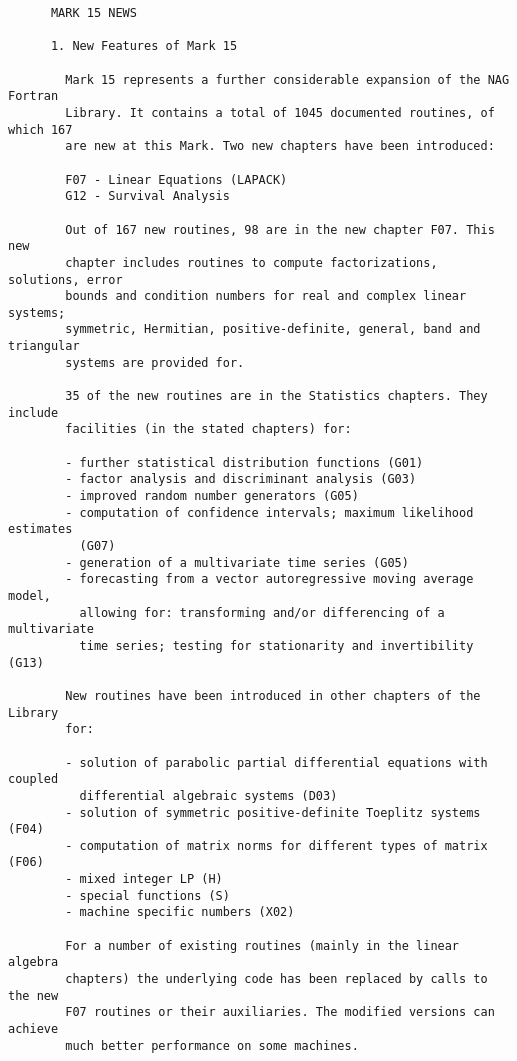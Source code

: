 \begin{small}
\begin{verbatim}
      MARK 15 NEWS

      1. New Features of Mark 15

        Mark 15 represents a further considerable expansion of the NAG Fortran
        Library. It contains a total of 1045 documented routines, of which 167
        are new at this Mark. Two new chapters have been introduced:

        F07 - Linear Equations (LAPACK)
        G12 - Survival Analysis

        Out of 167 new routines, 98 are in the new chapter F07. This new
        chapter includes routines to compute factorizations, solutions, error
        bounds and condition numbers for real and complex linear systems;
        symmetric, Hermitian, positive-definite, general, band and triangular
        systems are provided for.

        35 of the new routines are in the Statistics chapters. They include
        facilities (in the stated chapters) for:

        - further statistical distribution functions (G01)
        - factor analysis and discriminant analysis (G03)
        - improved random number generators (G05)
        - computation of confidence intervals; maximum likelihood estimates
          (G07)
        - generation of a multivariate time series (G05)
        - forecasting from a vector autoregressive moving average model,
          allowing for: transforming and/or differencing of a multivariate
          time series; testing for stationarity and invertibility (G13)

        New routines have been introduced in other chapters of the Library
        for:

        - solution of parabolic partial differential equations with coupled
          differential algebraic systems (D03)
        - solution of symmetric positive-definite Toeplitz systems (F04)
        - computation of matrix norms for different types of matrix (F06)
        - mixed integer LP (H)
        - special functions (S)
        - machine specific numbers (X02)

        For a number of existing routines (mainly in the linear algebra
        chapters) the underlying code has been replaced by calls to the new
        F07 routines or their auxiliaries. The modified versions can achieve
        much better performance on some machines.



\end{verbatim}
\end{small}

